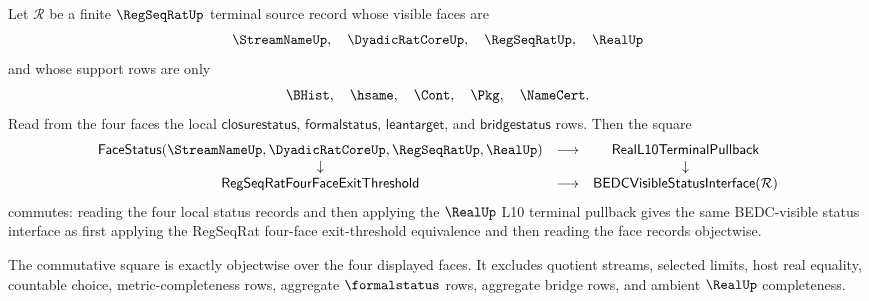 \begin{theorem}
\label{thm:regseqrat-audit-threshold-status-pullback-square}
Let $\mathcal R$ be a finite $\RegSeqRatUp$ terminal source record whose visible faces are
$$
\StreamNameUp,\quad \DyadicRatCoreUp,\quad \RegSeqRatUp,\quad \RealUp
$$
and whose support rows are only
$$
\BHist,\quad \hsame,\quad \Cont,\quad \Pkg,\quad \NameCert.
$$
Read from the four faces the local $\mathsf{closurestatus}$, $\mathsf{formalstatus}$, $\mathsf{leantarget}$, and $\mathsf{bridgestatus}$ rows. Then the square
$$
\begin{array}{ccc}
\mathsf{FaceStatus}(\StreamNameUp,\DyadicRatCoreUp,\RegSeqRatUp,\RealUp)
& \longrightarrow &
\mathsf{RealL10TerminalPullback} \\
\downarrow & & \downarrow \\
\mathsf{RegSeqRatFourFaceExitThreshold}
& \longrightarrow &
\mathsf{BEDCVisibleStatusInterface}(\mathcal R)
\end{array}
$$
commutes: reading the four local status records and then applying the $\RealUp$ L10 terminal pullback gives the same BEDC-visible status interface as first applying the RegSeqRat four-face exit-threshold equivalence and then reading the face records objectwise.

The commutative square is exactly objectwise over the four displayed faces. It excludes quotient streams, selected limits, host real equality, countable choice, metric-completeness rows, aggregate $\formalstatus$ rows, aggregate bridge rows, and ambient $\RealUp$ completeness.
\end{theorem}
